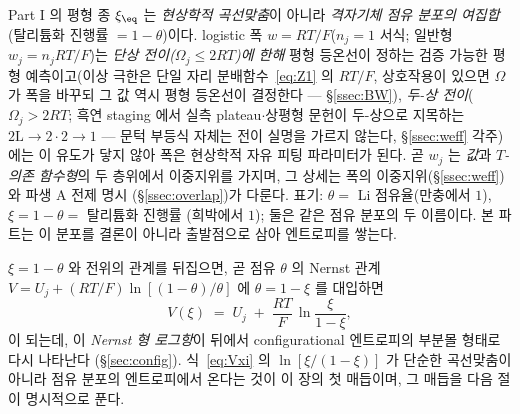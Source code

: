 \begin{keybox}
Part I 의 평형 종 $\xi_\eq$ 는 \emph{현상학적 곡선맞춤}이 아니라 \emph{격자기체 점유 분포의 여집합}(탈리튬화
진행률 $=1-\theta$)이다. logistic 폭 $w=RT/F$($n_j{=}1$ 서식; 일반형 $w_j=n_jRT/F$)는 \emph{단상
전이($\Omega_j\le2RT$)에 한해} 평형 등온선이 정하는 검증 가능한 평형 예측이고(이상 극한은 단일 자리
분배함수~\eqref{eq:Z1} 의 $RT/F$, 상호작용이 있으면 $\Omega$ 가 폭을 바꾸되 그 값 역시 평형 등온선이
결정한다 --- \S\ref{ssec:BW}), \emph{두-상 전이}($\Omega_j>2RT$; 흑연 staging 에서 실측 plateau$\cdot$상평형
문헌이 두-상으로 지목하는 $2\mathrm L\!\to\!2\cdot2\!\to\!1$ \cite{dahn1991,ohzuku1993} --- 문턱 부등식
자체는 전이 실명을 가르지 않는다, \S\ref{ssec:weff} 각주)에는 이 유도가 닿지 않아 폭은 현상학적 자유 피팅
파라미터가 된다. 곧 $w_j$ 는 \emph{값}과 \emph{$T$-의존
함수형}의 두 층위에서 이중지위를 가지며, 그 상세는 폭의 이중지위(\S\ref{ssec:weff})와 파생 A 전제 명시
(\S\ref{ssec:overlap})가 다룬다. 표기: $\theta=$ Li 점유율(만충에서 $1$), $\xi=1-\theta=$ 탈리튬화 진행률
(희박에서 $1$); 둘은 같은 점유 분포의 두 이름이다. 본 파트는 이 분포를 결론이 아니라 출발점으로 삼아 엔트로피를
쌓는다.
\end{keybox}

$\xi=1-\theta$ 와 전위의 관계를 뒤집으면, 곧 점유 $\theta$ 의 Nernst 관계
$V=U_j+(RT/F)\ln[(1-\theta)/\theta]$ 에 $\theta=1-\xi$ 를 대입하면
\begin{equation}
V(\xi) \;=\; U_j \;+\; \frac{RT}{F}\,\ln\!\frac{\xi}{1-\xi},
\label{eq:Vxi}
\end{equation}
이 되는데, 이 \emph{Nernst 형 로그항}이 뒤에서 configurational 엔트로피의 부분몰 형태로 다시 나타난다
(\S\ref{sec:config}). 식~\eqref{eq:Vxi} 의 $\ln[\xi/(1-\xi)]$ 가 단순한 곡선맞춤이 아니라 점유 분포의
엔트로피에서 온다는 것이 이 장의 첫 매듭이며, 그 매듭을 다음 절이 명시적으로 푼다.

